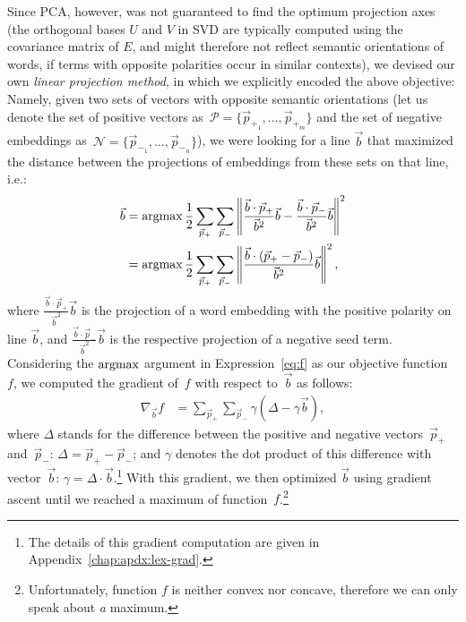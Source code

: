 Since PCA, however, was not guaranteed to find the optimum projection
axes (the orthogonal bases $U$ and $V$ in SVD are typically computed
using the covariance matrix of $E$, and might therefore not reflect
semantic orientations of words, if terms with opposite polarities
occur in similar contexts), we devised our own \emph{linear projection
  method}, in which we explicitly encoded the above objective: Namely,
given two sets of vectors with opposite semantic orientations (let us
denote the set of positive vectors as~$\mathcal{P} =
\{\vec{p}_{+_1},\ldots,\vec{p}_{+_m}\}$ and the set of negative
embeddings as~$\mathcal{N} = \{\vec{p}_{-_1},\ldots,\vec{p}_{-_n}\}$),
we were looking for a line $\vec{b}$ that maximized the distance
between the projections of embeddings from these sets on that line, i.e.: {\small%
  \begin{align}
    \begin{split}
      \small
      \vec{b} &=\argmax\frac{1}{2}\sum_{\vec{p}_+}\sum_{\vec{p}_-}%
      \left\lVert\frac{\vec{b}\cdot\vec{p}_+}{\vec{b}^2}\vec{b}%
      - \frac{\vec{b}\cdot\vec{p}_-}{\vec{b}^2}\vec{b}\right\rVert^2\\
      &=\argmax\frac{1}{2}\sum_{\vec{p}_+}\sum_{\vec{p}_-}\left\lVert\frac{\vec{b}%
        \cdot\left(\vec{p}_{+}-\vec{p}_{-}\right)}{\vec{b}^2}\vec{b}\right\rVert^2,\label{eq:f}%
    \end{split}
  \end{align}\normalsize}%
where $\frac{\vec{b}\cdot\vec{p}_+}{\vec{b}^2}\vec{b}$ is the
projection of a word embedding with the positive polarity on line
$\vec{b}$, and $\frac{\vec{b}\cdot\vec{p}_-}{\vec{b}^2}\vec{b}$ is the
respective projection of a negative seed term.  Considering the
$\argmax$ argument in Expression~\ref{eq:f} as our objective
function~$f$, we computed the gradient of~$f$ with respect
to~$\vec{b}$ as follows: {\small%
  \begin{align}
    \nabla_{\vec{b}} f &= \sum_{\vec{p}_+}\sum_{\vec{p}_-}%
               \gamma\left(\Delta - \gamma\vec{b}\right),\label{eq:prj-line-grad}%
\end{align}\normalsize}%
where $\Delta$ stands for the difference between the positive and
negative vectors~$\vec{p}_{+}$ and~$\vec{p}_{-}$: $\Delta =
\vec{p}_{+}-\vec{p}_{-}$; and $\gamma$ denotes the dot product of this
difference with vector~$\vec{b}$: $\gamma = \Delta \cdot
\vec{b}$.\footnote{The details of this gradient computation are given
  in Appendix~\ref{chap:apdx:lex-grad}.}  With this gradient, we then
optimized $\vec{b}$ using gradient ascent until we reached a maximum
of function~$f$.\footnote{Unfortunately, function $f$ is neither
  convex nor concave, therefore we can only speak about \emph{a}
  maximum.}

